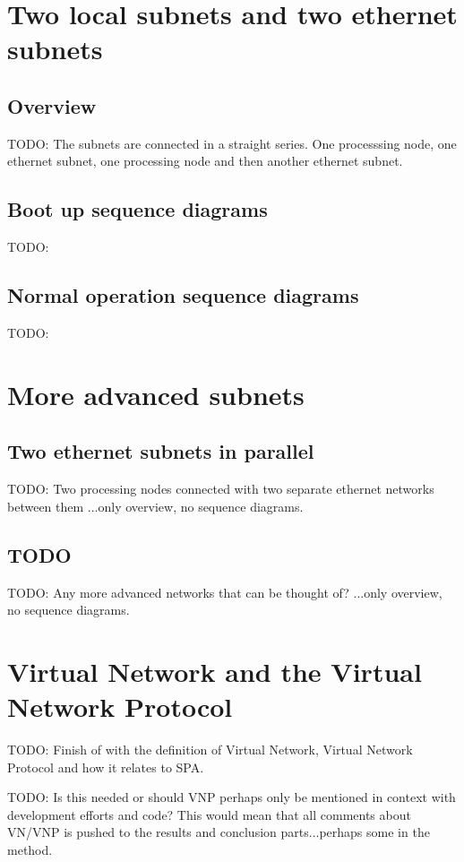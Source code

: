 \section{Two local subnets and two ethernet subnets}
\subsection{Overview}
TODO: The subnets are connected in a straight series. One processsing node, one
ethernet subnet, one processing node and then another ethernet subnet.

\subsection{Boot up sequence diagrams}
TODO:

\subsection{Normal operation sequence diagrams}
TODO:

\section{More advanced subnets}
\subsection{Two ethernet subnets in parallel}
TODO: Two processing nodes connected with two separate ethernet networks
between them ...only overview, no sequence diagrams.

\subsection{TODO}
TODO: Any more advanced networks that can be thought of? ...only overview, no
sequence diagrams.

\section{Virtual Network and the Virtual Network Protocol}
TODO: Finish of with the definition of Virtual Network, Virtual Network
Protocol and how it relates to SPA.

TODO: Is this needed or should VNP perhaps only be mentioned in context with
development efforts and code? This would mean that all comments about VN/VNP is
pushed to the results and conclusion parts...perhaps some in the method.
